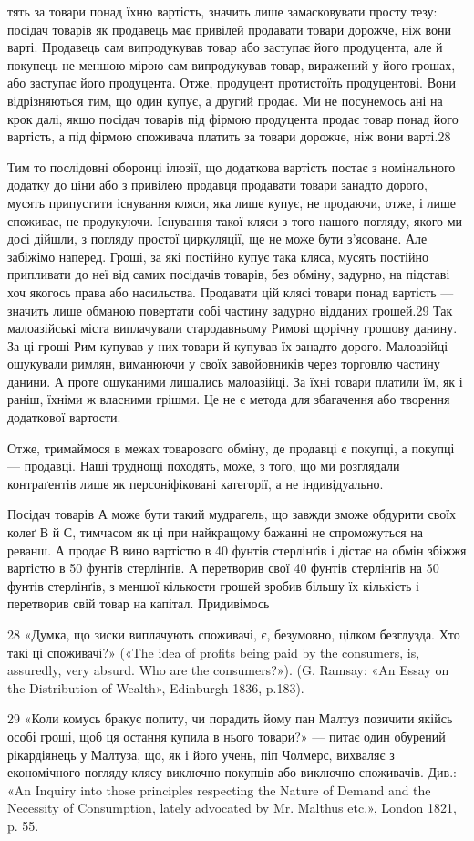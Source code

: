 тять за товари понад їхню вартість, значить лише замасковувати
просту тезу: посідач товарів як продавець має привілей продавати
товари дорожче, ніж вони варті. Продавець сам випродукував
товар або заступає його продуцента, але й покупець не меншою
мірою сам випродукував товар, виражений у його грошах,
або заступає його продуцента. Отже, продуцент протистоїть
продуцентові. Вони відрізняються тим, що один купує, а другий
продає. Ми не посунемось ані на крок далі, якщо посідач товарів
під фірмою продуцента продає товар понад його вартість, а під
фірмою споживача платить за товари дорожче, ніж вони варті.28

Тим то послідовні оборонці ілюзії, що додаткова вартість
постає з номінального додатку до ціни або з привілею продавця
продавати товари занадто дорого, мусять припустити існування
кляси, яка лише купує, не продаючи, отже, і лише споживає,
не продукуючи. Існування такої кляси з того нашого погляду,
якого ми досі дійшли, з погляду простої циркуляції, ще не може
бути з’ясоване. Але забіжімо наперед. Гроші, за які постійно
купує така кляса, мусять постійно припливати до неї від самих
посідачів товарів, без обміну, задурно, на підставі хоч якогось
права або насильства. Продавати цій клясі товари понад вартість
— значить лише обманою повертати собі частину задурно
відданих грошей.29 Так малоазійські міста виплачували стародавньому
Римові щорічну грошову данину. За ці гроші Рим купував
у них товари й купував їх занадто дорого. Малоазійці ошукували
римлян, виманюючи у своїх завойовників через торговлю
частину данини. А проте ошуканими лишались малоазійці. За
їхні товари платили їм, як і раніш, їхніми ж власними грішми.
Це не є метода для збагачення або творення додаткової вартости.

Отже, тримаймося в межах товарового обміну, де продавці
є покупці, а покупці — продавці. Наші труднощі походять,
може, з того, що ми розглядали контраґентів лише як персоніфіковані
категорії, а не індивідуально.

Посідач товарів А може бути такий мудрагель, що завжди
зможе обдурити своїх колеґ В й С, тимчасом як ці при найкращому
бажанні не спроможуться на реванш. А продає В вино вартістю
в 40 фунтів стерлінґів і дістає на обмін збіжжя вартістю в
50 фунтів стерлінґів. А перетворив свої 40 фунтів стерлінґів
на 50 фунтів стерлінґів, з меншої кількости грошей зробив більшу
їх кількість і перетворив свій товар на капітал. Придивімось

28 «Думка, що зиски виплачують споживачі, є, безумовно, цілком
безглузда. Хто такі ці споживачі?» («The idea of profits being paid by
the consumers, is, assuredly, very absurd. Who are the consumers?»).
(G. Ramsay: «An Essay on the Distribution of Wealth», Edinburgh 1836, p.183).

29 «Коли комусь бракує попиту, чи порадить йому пан Малтуз позичити
якійсь особі гроші, щоб ця остання купила в нього товари?» — питає
один обурений рікардіянець у Малтуза, що, як і його учень, піп Чолмерс,
вихваляє з економічного погляду клясу виключно покупців або виключно
споживачів. Див.: «An Inquiry into those principles respecting the Nature
of Demand and the Necessity of Consumption, lately advocated by Mr. Malthus
etc.», London 1821, p. 55.
